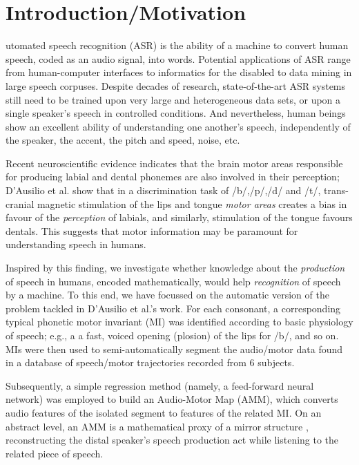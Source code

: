 \section{Introduction/Motivation}
\label{sec:intro}

utomated speech recognition (ASR) is the ability of a machine
to convert human speech, coded as an audio signal, into words.
Potential applications of ASR range from human-computer interfaces
to informatics for the disabled to data mining in large speech corpuses.
Despite decades of research, state-of-the-art ASR
systems still need to be trained upon very large and heterogeneous data sets, or upon
a single speaker's speech in controlled conditions.
And nevertheless, human beings show an excellent ability
of understanding one another's speech, independently of the speaker, the
accent, the pitch and speed, noise, etc.

Recent neuroscientific
evidence indicates that the brain motor areas responsible for producing labial
and dental phonemes are also involved in their perception; D'Ausilio et al. \cite{dausilio}
show that in a discrimination task of /b/,/p/,/d/ and /t/, trans-cranial magnetic
stimulation of the lips and tongue \emph{motor areas} creates a bias in favour
of the \emph{perception} of labials, and similarly, stimulation of the tongue
favours dentals. This suggests that motor information may be paramount for
understanding speech in humans.

Inspired by this finding, we investigate whether knowledge about the \emph{production}
of speech in humans, encoded mathematically, would help \emph{recognition}
of speech by a machine. To this end, we have focussed on the automatic version of
the problem tackled in D'Ausilio et al.'s work. For each consonant,
a corresponding typical phonetic motor invariant (MI) was
identified according to basic physiology of speech;
e.g., a a fast, voiced opening (plosion) of the lips for /b/, and so on.
MIs were then used to semi-automatically segment the audio/motor data found in a
database of speech/motor trajectories recorded from $6$ subjects.

Subsequently, a simple regression method (namely, a feed-forward neural network) was employed
to build an Audio-Motor Map (AMM), which converts audio features of the isolated segment to
features of the related MI. On an abstract level, an AMM is a mathematical proxy of a mirror
structure \cite{umilta-01}, reconstructing the distal speaker's speech production act while
listening to the related piece of speech.

